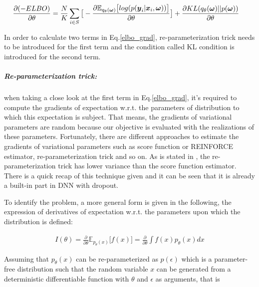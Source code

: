 \begin{equation}
\begin{aligned} \label{elbo_grad}
\frac{\partial (-ELBO)}{\partial \theta} &=\frac{N}{K}\sum_{i \in S}\big[-\frac{\partial \mathbb E_{q_{\theta}(\boldsymbol \omega)} \big[log(p(\boldsymbol y_{i}| \boldsymbol x_{i}, \boldsymbol \omega))\big]}{\partial \theta}\big] + \frac{\partial KL(q_{\theta}(\boldsymbol \omega)||p(\boldsymbol \omega))}{\partial \theta}
\end{aligned}
\end{equation}

In order to calculate two terms in Eq.\ref{elbo_grad}, re-parameterization trick\cite{kingma2013auto} needs to be introduced for the first term and the condition called KL condition\cite{gal2016uncertainty} is introduced for the second term.

\subparagraph{Re-parameterization trick:} when taking a close look at the first term in Eq.\ref{elbo_grad},  it's required to compute the gradients of expectation w.r.t. the parameters of distribution to which this expectation is subject. That means, the gradients of variational parameters are random because our objective is evaluated with the realizations of these parameters. Fortunately, there are different approaches to estimate the gradients of variational parameters such as score function or REINFORCE estimator\cite{williams1992simple}, re-parameterization trick \cite{kingma2013auto} and so on. As is stated in \cite{kingma2013auto}, the re-parameterization trick has lower variance than the score function estimator. There is a quick recap of this technique given and it can be seen that it is already a built-in part in DNN with dropout.

To identify the problem, a more general form is given in the following, the expression of derivatives of expectation w.r.t. the parameters upon which the distribution is defined:

\begin{equation}
\begin{aligned} \label{repa}
I(\theta) = \frac{\partial}{\partial \theta} \mathbb E_{p_{\theta}(x)} \big[ f(x)\big]= \frac{\partial}{\partial \theta} \int f(x) p_{\theta}(x) dx
\end{aligned}
\end{equation} 

Assuming that $p_{\theta}(x)$ can be re-parameterized as $p(\epsilon)$ which is a parameter-free distribution such that the random variable $x$ can be generated from a deterministic differentiable function with $\theta$ and $\epsilon$ as arguments, that is

